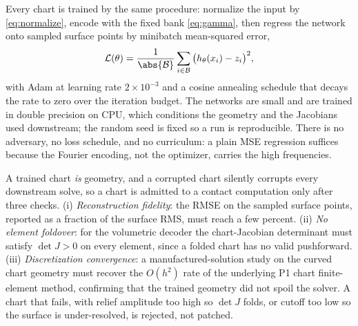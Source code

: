 Every chart is trained by the same procedure: normalize the input by \eqref{eq:normalize}, encode with the
fixed bank \eqref{eq:gamma}, then regress the network onto sampled surface points by minibatch
mean-squared error,
%
\begin{equation}\label{eq:mse}
\mathcal L(\theta)=\frac{1}{\abs{\mathcal B}}\sum_{i\in\mathcal B}\big(h_\theta(x_i)-z_i\big)^2,
\end{equation}
%
with Adam at learning rate $2\times10^{-3}$ and a cosine annealing schedule that decays the rate to zero
over the iteration budget. The networks are small and are trained in double precision on CPU, which
conditions the geometry and the Jacobians used downstream; the random seed is fixed so a run is
reproducible. There is no adversary, no loss schedule, and no curriculum: a plain MSE regression suffices
because the Fourier encoding, not the optimizer, carries the high frequencies.

A trained chart \emph{is} geometry, and a corrupted chart silently corrupts every downstream solve, so a
chart is admitted to a contact computation only after three checks. (i) \emph{Reconstruction fidelity}: the
RMSE on the sampled surface points, reported as a fraction of the surface RMS, must reach a few percent.
(ii) \emph{No element foldover}: for the volumetric decoder the chart-Jacobian determinant must satisfy
$\det J>0$ on every element, since a folded chart has no valid pushforward. (iii) \emph{Discretization
convergence}: a manufactured-solution study on the curved chart geometry must recover the $O(h^2)$ rate of
the underlying P1 chart finite-element method, confirming that the trained geometry did not spoil the
solver. A chart that fails, with relief amplitude too high so $\det J$ folds, or cutoff too low so the
surface is under-resolved, is rejected, not patched.

